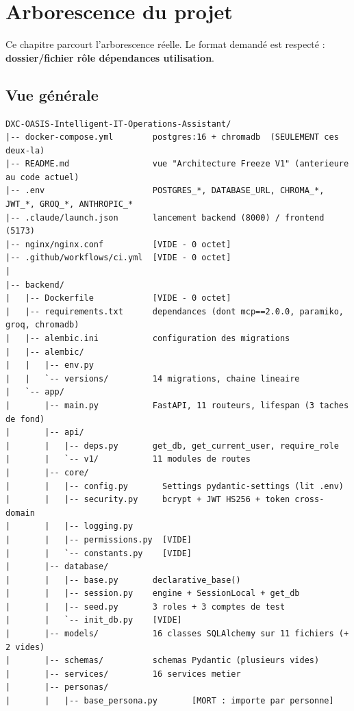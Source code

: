 \chapter{Arborescence du projet}
\label{ch:arbo}

Ce chapitre parcourt l'arborescence réelle. Le format demandé est respecté :
\textbf{dossier/fichier \arrowto{} rôle \arrowto{} dépendances \arrowto{}
utilisation}.

\section{Vue générale}

\begin{lstlisting}[caption={Arborescence réelle --- les fichiers vides sont signalés}]
DXC-OASIS-Intelligent-IT-Operations-Assistant/
|-- docker-compose.yml        postgres:16 + chromadb  (SEULEMENT ces deux-la)
|-- README.md                 vue "Architecture Freeze V1" (anterieure au code actuel)
|-- .env                      POSTGRES_*, DATABASE_URL, CHROMA_*, JWT_*, GROQ_*, ANTHROPIC_*
|-- .claude/launch.json       lancement backend (8000) / frontend (5173)
|-- nginx/nginx.conf          [VIDE - 0 octet]
|-- .github/workflows/ci.yml  [VIDE - 0 octet]
|
|-- backend/
|   |-- Dockerfile            [VIDE - 0 octet]
|   |-- requirements.txt      dependances (dont mcp==2.0.0, paramiko, groq, chromadb)
|   |-- alembic.ini           configuration des migrations
|   |-- alembic/
|   |   |-- env.py
|   |   `-- versions/         14 migrations, chaine lineaire
|   `-- app/
|       |-- main.py           FastAPI, 11 routeurs, lifespan (3 taches de fond)
|       |-- api/
|       |   |-- deps.py       get_db, get_current_user, require_role
|       |   `-- v1/           11 modules de routes
|       |-- core/
|       |   |-- config.py       Settings pydantic-settings (lit .env)
|       |   |-- security.py     bcrypt + JWT HS256 + token cross-domain
|       |   |-- logging.py
|       |   |-- permissions.py  [VIDE]
|       |   `-- constants.py    [VIDE]
|       |-- database/
|       |   |-- base.py       declarative_base()
|       |   |-- session.py    engine + SessionLocal + get_db
|       |   |-- seed.py       3 roles + 3 comptes de test
|       |   `-- init_db.py    [VIDE]
|       |-- models/           16 classes SQLAlchemy sur 11 fichiers (+ 2 vides)
|       |-- schemas/          schemas Pydantic (plusieurs vides)
|       |-- services/         16 services metier
|       |-- personas/
|       |   |-- base_persona.py       [MORT : importe par personne]

\end{lstlisting}
